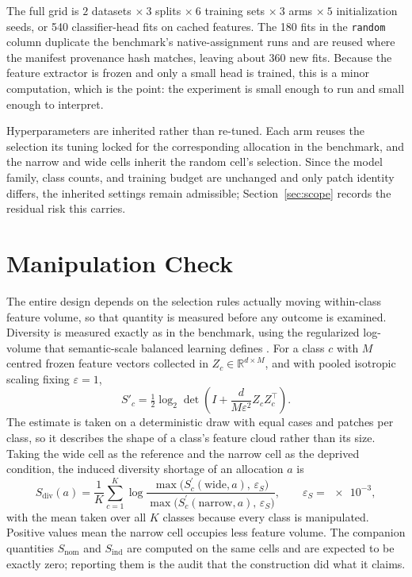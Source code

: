 \documentclass[11pt]{article}
\begin{document}
The full grid is $2$ datasets $\times\ 3$ splits $\times\ 6$ training sets $\times\ 3$ arms $\times\ 5$ initialization seeds, or \num{540} classifier-head fits on cached features. The \num{180} fits in the \texttt{random} column duplicate the benchmark's native-assignment runs and are reused where the manifest provenance hash matches, leaving about \num{360} new fits. Because the feature extractor is frozen and only a small head is trained, this is a minor computation, which is the point: the experiment is small enough to run and small enough to interpret.

Hyperparameters are inherited rather than re-tuned. Each arm reuses the selection its tuning locked for the corresponding allocation in the benchmark, and the narrow and wide cells inherit the random cell's selection. Since the model family, class counts, and training budget are unchanged and only patch identity differs, the inherited settings remain admissible; Section~\ref{sec:scope} records the residual risk this carries.

\section{Manipulation Check}
\label{sec:manipulation}
The entire design depends on the selection rules actually moving within-class feature volume, so that quantity is measured before any outcome is examined. Diversity is measured exactly as in the benchmark, using the regularized log-volume that semantic-scale balanced learning defines \citep{ma2023semanticScale}. For a class $c$ with $M$ centred frozen feature vectors collected in $Z_c \in \mathbb{R}^{d\times M}$, and with pooled isotropic scaling fixing $\varepsilon=1$,
\begin{equation}
  S'_c=\tfrac{1}{2}\log_2\det\!\left(I+\frac{d}{M\varepsilon^{2}}Z_cZ_c^{\top}\right).
  \label{eq:semantic-volume}
\end{equation}
\noindent The estimate is taken on a deterministic draw with equal cases and patches per class, so it describes the shape of a class's feature cloud rather than its size. Taking the wide cell as the reference and the narrow cell as the deprived condition, the induced diversity shortage of an allocation $a$ is
\begin{equation}
  S_{\mathrm{div}}(a)=\frac{1}{K}\sum_{c=1}^{K}
  \log\frac{\max\!\big(S_c^{\prime}(\text{wide},a),\,\varepsilon_S\big)}
           {\max\!\big(S_c^{\prime}(\text{narrow},a),\,\varepsilon_S\big)},
  \qquad \varepsilon_S=\num{e-3},
  \label{eq:diversity-shortage}
\end{equation}
\noindent with the mean taken over all $K$ classes because every class is manipulated. Positive values mean the narrow cell occupies less feature volume. The companion quantities $S_{\mathrm{nom}}$ and $S_{\mathrm{ind}}$ are computed on the same cells and are expected to be exactly zero; reporting them is the audit that the construction did what it claims.
\end{document}
